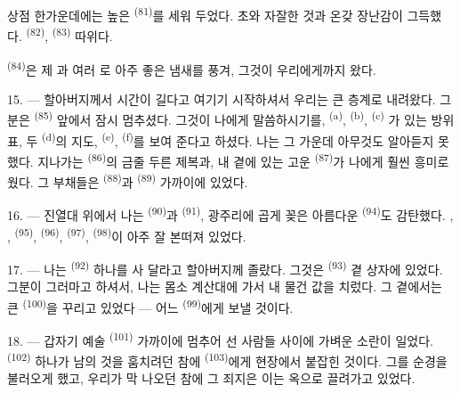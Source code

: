상점 한가운데에는 높은  \textsuperscript{(81)}를 세워 두었다. 초와
자잘한 것과 온갖 장난감이 그득했다.  \textsuperscript{(82)},
 \textsuperscript{(83)} 따위다.

 \textsuperscript{(84)}은 제 과 여러 로 아주 좋은
냄새를 풍겨, 그것이 우리에게까지 왔다.

\VUsaut{3.4mm}
\VUsaut{2.8mm}

15. --- 할아버지께서 시간이 길다고 여기기 시작하셔서 우리는 큰 층계로 내려왔다. 그분은
 \textsuperscript{(85)} 앞에서 잠시 멈추셨다. 그것이 나에게 말씀하시기를,
 \textsuperscript{(a)},  \textsuperscript{(b)},
 \textsuperscript{(c)} 가 있는 방위표, 두
 \textsuperscript{(d)}의 지도,  \textsuperscript{(e)},
 \textsuperscript{(f)}를 보여 준다고 하셨다. 나는 그 가운데 아무것도
알아듣지 못했다. 지나가는  \textsuperscript{(86)}의 금줄 두른 제복과,
내 곁에 있는 고운  \textsuperscript{(87)}가 나에게 훨씬 흥미로웠다. 그
부채들은  \textsuperscript{(88)}과  \textsuperscript{(89)}
가까이에 있었다.

16. --- 진열대 위에서 나는  \textsuperscript{(90)}과 
\textsuperscript{(91)}, 광주리에 곱게 꽂은 아름다운  \textsuperscript{(94)}도
감탄했다. , ,  \textsuperscript{(95)},
 \textsuperscript{(96)},  \textsuperscript{(97)},
 \textsuperscript{(98)}이 아주 잘 본떠져 있었다.

\VUsaut{4.4mm}
\VUsaut{2.8mm}

17. --- 나는  \textsuperscript{(92)} 하나를 사 달라고 할아버지께 졸랐다.
그것은  \textsuperscript{(93)} 곁 상자에 있었다. 그분이 그러마고 하셔서,
나는 몸소 계산대에 가서 내 물건 값을 치렀다. 그 곁에서는 큰 
\textsuperscript{(100)}을 꾸리고 있었다 — 어느  \textsuperscript{(99)}에게
보낼 것이다.

18. --- 갑자기 예술  \textsuperscript{(101)} 가까이에 멈추어 선 사람들
사이에 가벼운 소란이 일었다.  \textsuperscript{(102)} 하나가 남의 것을
훔치려던 참에  \textsuperscript{(103)}에게 현장에서 붙잡힌 것이다. 그를
 순경을 불러오게 했고, 우리가 막 나오던 참에 그 죄지은 이는
옥으로 끌려가고 있었다.

\VUsaut{6.0mm}
\VUfilet{22mm}

